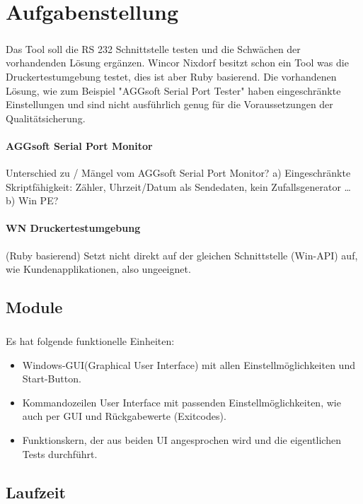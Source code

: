 
\chapter{Aufgabenstellung}
\paragraph{}
Das Tool soll die RS 232 Schnittstelle testen und die Schwächen der vorhandenden Lösung ergänzen. Wincor Nixdorf besitzt schon ein Tool was die Druckertestumgebung testet, dies ist aber Ruby basierend. Die vorhandenen Lösung, wie zum Beispiel "AGGsoft Serial Port Tester" haben eingeschränkte Einstellungen und sind nicht ausführlich genug für die Voraussetzungen der Qualitätsicherung.

\subsubsection{AGGsoft Serial Port Monitor}
Unterschied zu / Mängel vom AGGsoft Serial Port Monitor?
a) Eingeschränkte Skriptfähigkeit: Zähler, Uhrzeit/Datum als Sendedaten, kein Zufallsgenerator …
b) Win PE?
\subsubsection{WN Druckertestumgebung}
(Ruby basierend)
Setzt nicht direkt auf der gleichen Schnittstelle (Win-API) auf, wie Kundenapplikationen, also ungeeignet.



\section{Module}
\paragraph{}
Es hat folgende funktionelle Einheiten:
\begin{itemize}
\item Windows-GUI(Graphical User Interface) mit allen Einstellmöglichkeiten und Start-Button.
\item Kommandozeilen User Interface mit passenden Einstellmöglichkeiten, wie auch per GUI und Rückgabewerte (Exitcodes).
\item Funktionskern, der aus beiden UI angesprochen wird und die eigentlichen Tests durchführt.
\end{itemize}


\section{Laufzeit}
